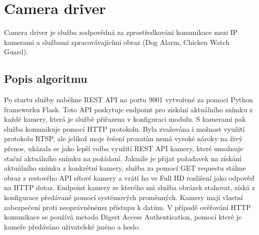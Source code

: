 \section{Camera driver}\label{sec:camera-driver}
Camera driver je služba zodpovědná za zprostředkování komunikace mezi IP kamerami a službami zpracovávajícími obraz (Dog Alarm, Chicken Watch Guard).\newline

\subsection*{Popis algoritmu}
Po startu služby naběhne REST API na portu 9001 vytvořené za pomoci Python frameworku Flask.
Toto API poskytuje endpoint pro získání aktuálního snímku z každé kamery, která je službě přiřazena v konfiguraci modulu.
S kamerami pak služba komunikuje pomocí HTTP protokolu.
Byla zvažována i možnost využití protokolu RTSP, ale jelikož moje řešení prozatím nemá vysoké nároky na živý přenos, ukázala se jako lepší volba využití REST API kamery, které umožnuje stační aktuálního snímku na požádaní.
Jakmile je přijat požadavek na získání aktuálního snímku z konkrétní kamery, služba za pomocí GET requestu stáhne obraz z restového API síťové kamery a vrátí ho ve Full HD rozlišení jako odpověď na HTTP dotaz.
Endpoint kamery ze kterého má služba obrázek stahovat, získá z konfigurace předávané pomocí systémových proměnných.
Kamery mají vlastní zabezpečení proti neoprávněnému přístupu k datům.
V případě ověřování HTTP komunikace se používá metoda Digest Access Authentication, pomocí které je kameře předáváno uživatelské jméno a heslo.


%
%
%
%
